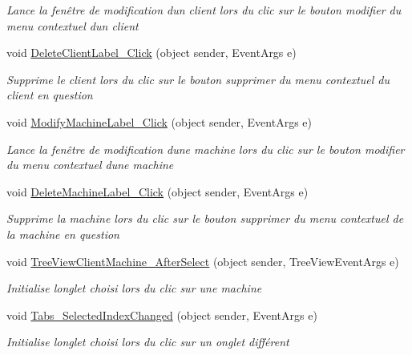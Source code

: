 \begin{DoxyCompactItemize}
\begin{DoxyCompactList}\small\item\em Lance la fenêtre de modification d\textquotesingle{}un client lors du clic sur le bouton modifier du menu contextuel d\textquotesingle{}un client \end{DoxyCompactList}\item 
void \mbox{\hyperlink{class_m_t_connect_agent_1_1_form_main_a63b6bc05b458da02b80617365163d10d}{Delete\+Client\+Label\+\_\+\+Click}} (object sender, Event\+Args e)
\begin{DoxyCompactList}\small\item\em Supprime le client lors du clic sur le bouton supprimer du menu contextuel du client en question \end{DoxyCompactList}\item 
void \mbox{\hyperlink{class_m_t_connect_agent_1_1_form_main_ab8577129e9dfbf78979a80aaf5e7bf6a}{Modify\+Machine\+Label\+\_\+\+Click}} (object sender, Event\+Args e)
\begin{DoxyCompactList}\small\item\em Lance la fenêtre de modification d\textquotesingle{}une machine lors du clic sur le bouton modifier du menu contextuel d\textquotesingle{}une machine \end{DoxyCompactList}\item 
void \mbox{\hyperlink{class_m_t_connect_agent_1_1_form_main_a326e8aba114dece871aa510ce1aa495e}{Delete\+Machine\+Label\+\_\+\+Click}} (object sender, Event\+Args e)
\begin{DoxyCompactList}\small\item\em Supprime la machine lors du clic sur le bouton supprimer du menu contextuel de la machine en question \end{DoxyCompactList}\item 
void \mbox{\hyperlink{class_m_t_connect_agent_1_1_form_main_a5b5fed31ec48f818e016ffc50d2c930a}{Tree\+View\+Client\+Machine\+\_\+\+After\+Select}} (object sender, Tree\+View\+Event\+Args e)
\begin{DoxyCompactList}\small\item\em Initialise l\textquotesingle{}onglet choisi lors du clic sur une machine \end{DoxyCompactList}\item 
void \mbox{\hyperlink{class_m_t_connect_agent_1_1_form_main_a7bca59d140a9c1514af0c5ab7b7f2166}{Tabs\+\_\+\+Selected\+Index\+Changed}} (object sender, Event\+Args e)
\begin{DoxyCompactList}\small\item\em Initialise l\textquotesingle{}onglet choisi lors du clic sur un onglet différent \end{DoxyCompactList}\item 

\end{DoxyCompactItemize}
